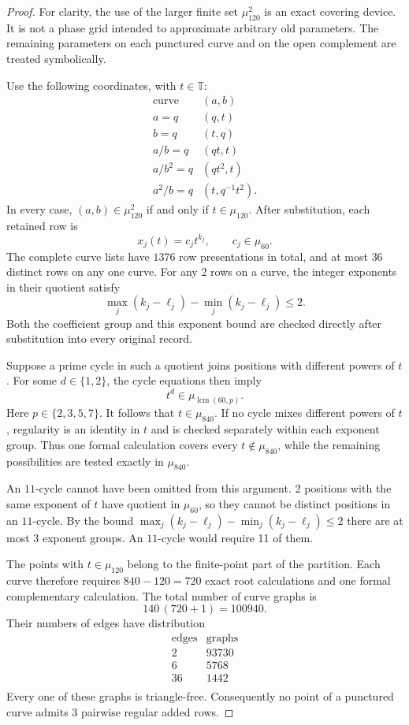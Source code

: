 \documentclass[11pt,a4paper]{article}
\theoremstyle{plain}
\theoremstyle{definition}
\theoremstyle{plain}
\begin{document}
\begin{proof}
For clarity, the use of the larger finite set $\mu_{120}^2$ is an exact covering device. It is not a phase grid intended to approximate arbitrary old parameters. The remaining parameters on each punctured curve and on the open complement are treated symbolically.

\medskip
Use the following coordinates, with $t\in\mathbb T$:
\[
\begin{array}{c|c}
\text{curve}&(a,b)\\\hline
a=q&(q,t)\\
b=q&(t,q)\\
a/b=q&(qt,t)\\
a/b^2=q&(qt^2,t)\\
a^2/b=q&(t,q^{-1}t^2).
\end{array}
\]
In every case, $(a,b)\in\mu_{120}^2$ if and only if $t\in\mu_{120}$. After substitution, each retained row is
\[
x_j(t)=c_j t^{k_j},\qquad c_j\in\mu_{60}.
\]
The complete curve lists have $1376$ row presentations in total, and at most $36$ distinct rows on any one curve. For any 2 rows on a curve, the integer exponents in their quotient satisfy
\[
\max_j(k_j-\ell_j)-\min_j(k_j-\ell_j)\leq2.
\]
Both the coefficient group and this exponent bound are checked directly after substitution into every original record.

Suppose a prime cycle in such a quotient joins positions with different powers of $t$. For some $d\in\{1,2\}$, the cycle equations then imply
\[
t^d\in\mu_{\operatorname{lcm}(60,p)}.
\]
Here $p\in\{2,3,5,7\}$. It follows that $t\in\mu_{840}$. If no cycle mixes different powers of $t$, regularity is an identity in $t$ and is checked separately within each exponent group. Thus one formal calculation covers every $t\notin\mu_{840}$, while the remaining possibilities are tested exactly in $\mu_{840}$.

An $11$-cycle cannot have been omitted from this argument. 2 positions with the same exponent of $t$ have quotient in $\mu_{60}$, so they cannot be distinct positions in an $11$-cycle. By the bound $\max_j(k_j-\ell_j)-\min_j(k_j-\ell_j)\le2$ there are at most 3 exponent groups. An $11$-cycle would require 11 of them.

The points with $t\in\mu_{120}$ belong to the finite-point part of the partition. Each curve therefore requires $840-120=720$ exact root calculations and one formal complementary calculation. The total number of curve graphs is
\[
140\,(720+1)=100940.
\]
Their numbers of edges have distribution
\[
\begin{array}{c|r}
\text{edges}&\text{graphs}\\\hline
2&93730\\
6&5768\\
36&1442\\
\end{array}
\]
Every one of these graphs is triangle-free. Consequently no point of a punctured curve admits 3 pairwise regular added rows.


\end{proof}
\end{document}

